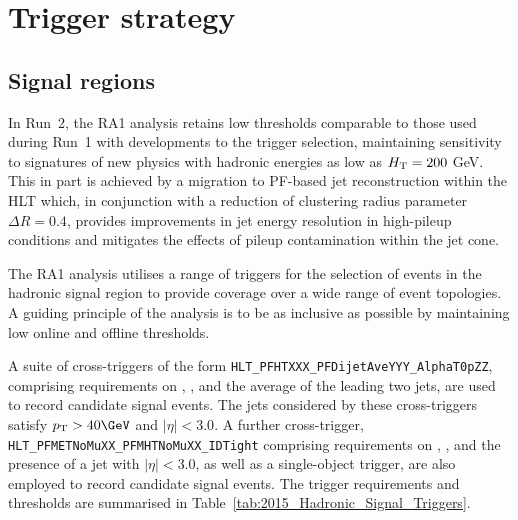 \section{Trigger strategy}
\label{sec:triggers}

\subsection{Signal regions\label{sec:hadronic_signal_region}}

In Run~2, the RA1 analysis retains low thresholds comparable to those
used during Run~1 with developments to the trigger selection,
maintaining sensitivity to signatures of new physics with hadronic
energies as low as $\mbox{$H_\text{T}$} = 200$ GeV. This in part is achieved by a
migration to PF-based jet reconstruction within the HLT which, in
conjunction with a reduction of clustering radius parameter $\Delta R
= 0.4$, provides improvements in jet energy resolution in high-pileup
conditions and mitigates the effects of pileup contamination within
the jet cone.

The RA1 analysis utilises a range of triggers for the selection of
events in the hadronic signal region to provide coverage over a wide
range of event topologies. A guiding principle of the analysis is to
be as inclusive as possible by maintaining low online and offline
thresholds. 

A suite of cross-triggers of the form
\verb!HLT_PFHTXXX_PFDijetAveYYY_AlphaT0pZZ!, comprising requirements
on \scalht, \alphat, and the average \pt of the leading two jets, are
used to record candidate signal events. The jets considered by these
cross-triggers satisfy $\Pt > 40\GeV$ and $|\eta| < 3.0$. A further
cross-trigger, \verb!HLT_PFMETNoMuXX_PFMHTNoMuXX_IDTight!  comprising
requirements on \MET, \HTmiss, and the presence of a jet with $|\eta|
< 3.0$, as well as a single-object \scalht trigger, are also employed
to record candidate signal events. The trigger requirements and
thresholds are summarised in
Table~\ref{tab:2015_Hadronic_Signal_Triggers}.


